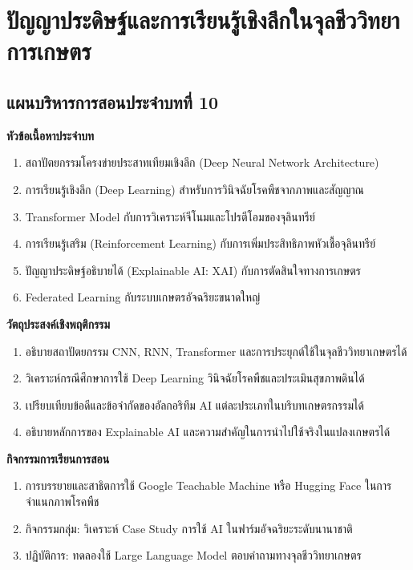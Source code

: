 \chapter{ปัญญาประดิษฐ์และการเรียนรู้เชิงลึกในจุลชีววิทยาการเกษตร}
\label{chap:ch10}

\section*{แผนบริหารการสอนประจำบทที่ 10}

\noindent\textbf{หัวข้อเนื้อหาประจำบท}
\begin{enumerate}
    \item สถาปัตยกรรมโครงข่ายประสาทเทียมเชิงลึก (Deep Neural Network Architecture)
    \item การเรียนรู้เชิงลึก (Deep Learning) สำหรับการวินิจฉัยโรคพืชจากภาพและสัญญาณ
    \item Transformer Model กับการวิเคราะห์จีโนมและโปรตีโอมของจุลินทรีย์
    \item การเรียนรู้เสริม (Reinforcement Learning) กับการเพิ่มประสิทธิภาพหัวเชื้อจุลินทรีย์
    \item ปัญญาประดิษฐ์อธิบายได้ (Explainable AI: XAI) กับการตัดสินใจทางการเกษตร
    \item Federated Learning กับระบบเกษตรอัจฉริยะขนาดใหญ่
\end{enumerate}

\noindent\textbf{วัตถุประสงค์เชิงพฤติกรรม}
\begin{enumerate}
    \item อธิบายสถาปัตยกรรม CNN, RNN, Transformer และการประยุกต์ใช้ในจุลชีววิทยาเกษตรได้
    \item วิเคราะห์กรณีศึกษาการใช้ Deep Learning วินิจฉัยโรคพืชและประเมินสุขภาพดินได้
    \item เปรียบเทียบข้อดีและข้อจำกัดของอัลกอริทึม AI แต่ละประเภทในบริบทเกษตรกรรมได้
    \item อธิบายหลักการของ Explainable AI และความสำคัญในการนำไปใช้จริงในแปลงเกษตรได้
\end{enumerate}

\noindent\textbf{กิจกรรมการเรียนการสอน}
\begin{enumerate}
    \item การบรรยายและสาธิตการใช้ Google Teachable Machine หรือ Hugging Face ในการจำแนกภาพโรคพืช
    \item กิจกรรมกลุ่ม: วิเคราะห์ Case Study การใช้ AI ในฟาร์มอัจฉริยะระดับนานาชาติ
    \item ปฏิบัติการ: ทดลองใช้ Large Language Model ตอบคำถามทางจุลชีววิทยาเกษตร
\end{enumerate}

